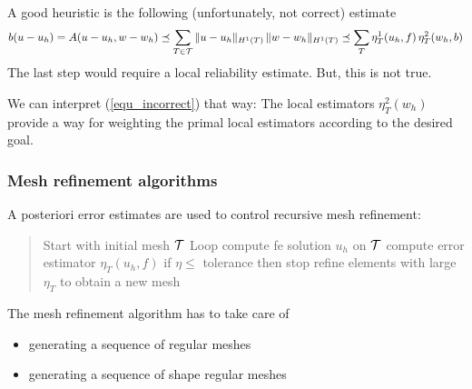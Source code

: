 A good heuristic is the following (unfortunately, not correct)
estimate
\begin{equation}
\label{equ_incorrect}
b(u-u_h)  = A(u-u_h, w-w_h) \preceq \sum_{T \in {\cal T} } 
        \| u - u_h \|_{H^1(T)} \, \| w - w_h \|_{H^1(T)} 
        \preceq \sum_{T} \eta_T^1 (u_h, f) \, \eta_T^2 (w_h, b)
\end{equation}
The last step would require a local reliability estimate. But, this is
not true.

We can interpret (\ref{equ_incorrect}) that way: The local estimators
$\eta^2_T(w_h)$ provide a way for weighting the primal local estimators
according to the desired goal.


\subsubsection{Mesh refinement algorithms}

A posteriori error estimates are used to control recursive mesh refinement:

\begin{quote}
Start with initial mesh ${\cal T}$ \newline
Loop \newline
\hspace*{1cm} compute fe solution $u_h$ on ${\cal T}$ \newline
\hspace*{1cm} compute error estimator $\eta_T (u_h, f)$ \newline
\hspace*{1cm} if $\eta \leq$ tolerance then stop \newline
\hspace*{1cm} refine elements with large $\eta_T$ to obtain a new mesh
\end{quote}

The mesh refinement algorithm has to take care of
\begin{itemize}
\item generating a sequence of regular meshes
\item generating a sequence of shape regular meshes
\end{itemize}

